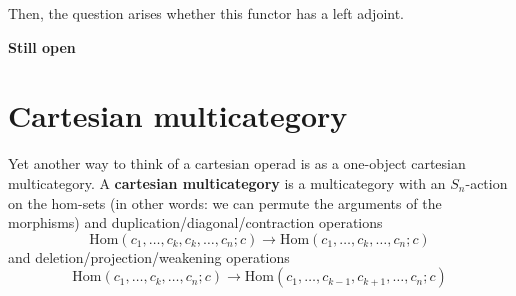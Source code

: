 \documentclass{amsbook}
\theoremstyle{definition}
\begin{document}
  Then, the question arises whether this functor has a left adjoint.

  \textbf{Still open}

  \section{Cartesian multicategory}
  Yet another way to think of a cartesian operad is as a one-object cartesian multicategory. A \textbf{cartesian multicategory} is a multicategory with an $ S_n $-action on the hom-sets (in other words: we can permute the arguments of the morphisms) and duplication/diagonal/contraction operations
  \[ \mathrm{Hom}(c_1, \dots, c_k, c_k, \dots, c_n; c) \to \mathrm{Hom}(c_1, \dots, c_k, \dots, c_n; c) \]
  and deletion/projection/weakening operations
  \[ \mathrm{Hom}(c_1, \dots, c_k, \dots, c_n; c) \to \mathrm{Hom}(c_1, \dots, c_{k-1}, c_{k+1}, \dots, c_n; c) \]
\end{document}
